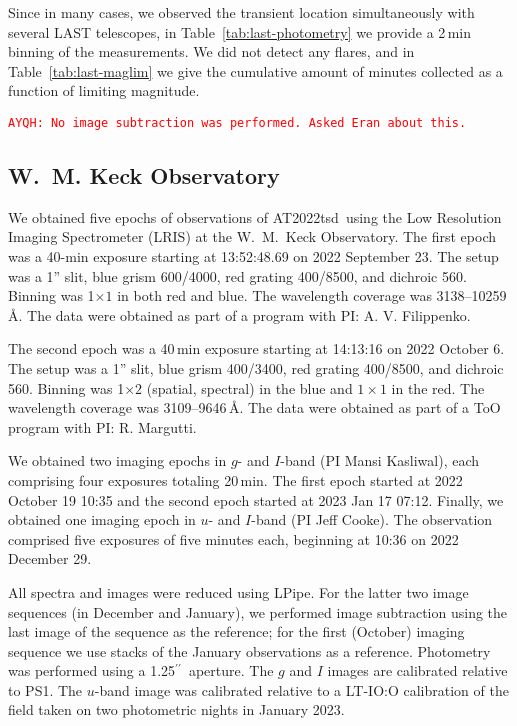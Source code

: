 \documentclass{nature_plusfigure}
\newcommand{\at}{AT2022tsd}
\newcommand{\ayqh}[1]{{\textcolor{red}{\texttt{AYQH: #1}}}}
\newcommand{\arcsec}{$^{\prime\prime}$}
\begin{document}
\begin{methods}
Since in many cases, we observed the transient location simultaneously with several LAST telescopes, in Table~\ref{tab:last-photometry} we provide a 2\,min binning of the measurements. We did not detect any flares, and in Table~\ref{tab:last-maglim} we give the cumulative amount of minutes collected as a function of limiting magnitude.

\ayqh{No image subtraction was performed. Asked Eran about this.}


\subsection{W.~M. Keck Observatory}
\label{sec:Keck}

We obtained five epochs of observations of \at\ using the Low Resolution Imaging Spectrometer (LRIS) at the W.~M.~Keck Observatory. The first epoch was a 40-min exposure starting at 13:52:48.69 on 2022 September 23. The setup was a 1'' slit, blue grism 600/4000, red grating 400/8500, and dichroic 560. Binning was 1$\times1$ in both red and blue. The wavelength coverage was 3138--10259\,\AA. The data were obtained as part of a program with PI: A. V. Filippenko.

The second epoch was a 40\,min exposure starting at 14:13:16 on 2022 October 6. The setup was a 1'' slit, blue grism 400/3400, red grating 400/8500, and dichroic 560. Binning was 1$\times2$ (spatial, spectral) in the blue and $1\times1$ in the red. The wavelength coverage was 3109--9646\,\AA. The data were obtained as part of a ToO program with PI: R. Margutti. 

We obtained two imaging epochs in $g$- and $I$-band (PI Mansi Kasliwal), each comprising four exposures totaling 20\,min. The first epoch started at 2022 October 19 10:35 and the second epoch started at 2023 Jan 17 07:12. 
Finally, we obtained one imaging epoch in $u$- and $I$-band (PI Jeff Cooke). The observation comprised five exposures of five minutes each, beginning at 10:36 on 2022 December 29.

All spectra and images were reduced using LPipe\cite{PerleyLPipe}. %
For the latter two image sequences (in December and January), we performed image subtraction using the last image of the sequence as the reference; for the first (October) imaging sequence we use stacks of the January observations as a reference.  Photometry was performed using a 1.25\arcsec\ aperture.  The $g$ and $I$ images are calibrated relative to PS1.  The $u$-band image was calibrated relative to a LT-IO:O calibration of the field taken on two photometric nights in January 2023.


\end{methods}
\end{document}
